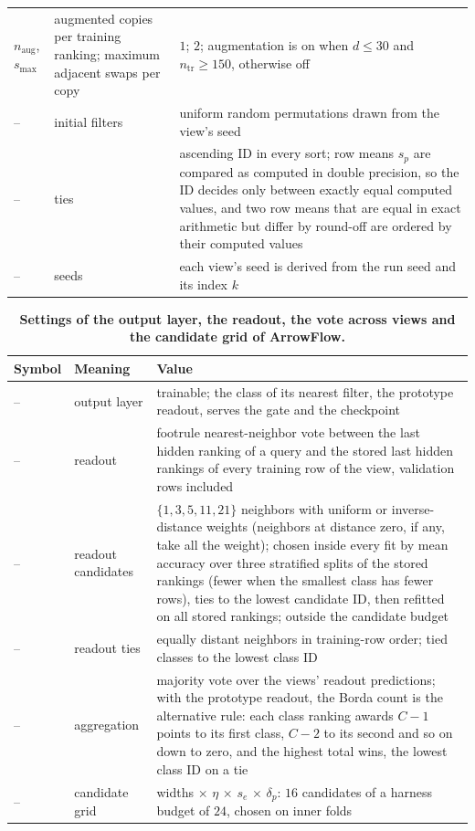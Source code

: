 \begin{table}[!htbp]
\begin{tabular}{@{}l p{} p{}@{}}
$n_{\mathrm{aug}}$, $s_{\max}$ & augmented copies per training ranking; maximum adjacent swaps per copy & $1$; $2$; augmentation is on when $d\le30$ and $n_{\mathrm{tr}}\ge150$, otherwise off \\
-- & initial filters & uniform random permutations drawn from the view's seed \\
-- & ties & ascending ID in every sort; row means $s_p$ are compared as computed in double precision, so the ID decides only between exactly equal computed values, and two row means that are equal in exact arithmetic but differ by round-off are ordered by their computed values \\
-- & seeds & each view's seed is derived from the run seed and its index $k$ \\
\bottomrule
\end{tabular}
\end{table}

\begin{table}[!htbp]
\caption{\textbf{Settings of the output layer, the readout, the vote across views and the candidate grid of ArrowFlow.}}
\label{tab:settings-readout}
\centering
\small
\begin{tabular}{@{}l p{} p{}@{}}
\toprule
Symbol & Meaning & Value \\
\midrule
-- & output layer & trainable; the class of its nearest filter, the prototype readout, serves the gate and the checkpoint \\
-- & readout & footrule nearest-neighbor vote between the last hidden ranking of a query and the stored last hidden rankings of every training row of the view, validation rows included \\
-- & readout candidates & $\{1,3,5,11,21\}$ neighbors with uniform or inverse-distance weights (neighbors at distance zero, if any, take all the weight); chosen inside every fit by mean accuracy over three stratified splits of the stored rankings (fewer when the smallest class has fewer rows), ties to the lowest candidate ID, then refitted on all stored rankings; outside the candidate budget \\
-- & readout ties & equally distant neighbors in training-row order; tied classes to the lowest class ID \\
-- & aggregation & majority vote over the views' readout predictions; with the prototype readout, the Borda count is the alternative rule: each class ranking awards $C-1$ points to its first class, $C-2$ to its second and so on down to zero, and the highest total wins, the lowest class ID on a tie \\
-- & candidate grid & widths $\times$ $\eta$ $\times$ $s_e$ $\times$ $\delta_p$: $16$ candidates of a harness budget of $24$, chosen on inner folds \\
\bottomrule
\end{tabular}
\end{table}

